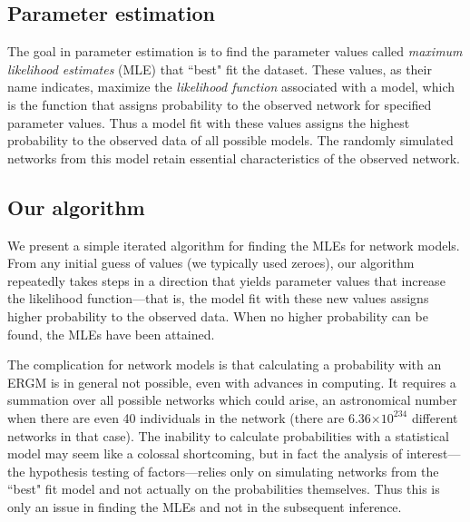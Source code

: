 \documentclass[12pt]{article}
\begin{document}
\subsection{Parameter estimation}
The goal in parameter estimation is to find the 
parameter values called \textit{maximum likelihood 
estimates} (MLE) that ``best" fit the dataset.  
These values, as their name indicates, maximize
the \emph{likelihood function} associated with a model, which is the function 
that assigns probability to the observed network for specified parameter values.
Thus a model fit with these values assigns the highest probability to the observed data of 
all possible models.  The randomly simulated networks from this model 
 retain essential characteristics of the observed network.


\subsection{Our algorithm}
We present a simple iterated algorithm for finding the MLEs for network models.
From any initial guess of values (we typically used zeroes), 
our algorithm repeatedly takes steps in a direction that 
yields parameter values that increase the likelihood function---that is, the model 
fit with these new values assigns higher probability to the observed data.    
When no higher probability can be found, the MLEs have been attained.  

The complication for network models is that 
calculating a probability with an ERGM is in general not possible, 
even with advances in computing.
It requires a summation over all possible networks which could arise, 
an astronomical number when there are even 40 individuals in the network 
(there are 6.36$\times10^{234}$ different networks in that case).  
The inability to calculate probabilities with a statistical model may seem 
like a colossal shortcoming, but in fact the analysis of interest---the 
hypothesis testing of factors---relies only on simulating 
networks from the ``best" fit model and not actually on the probabilities 
themselves.  Thus this is only an issue in finding the MLEs and not in 
the subsequent inference.
\end{document}
